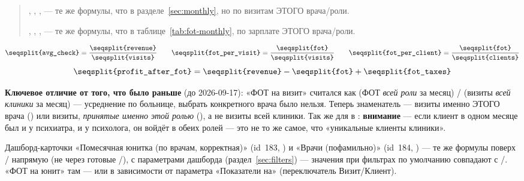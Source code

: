 \documentclass[11pt,a4paper]{article}
\begin{document}
\begin{quote}
\texttt{}, \texttt{}, \texttt{}, \texttt{}
--- те же формулы, что в разделе~\ref{sec:monthly}, но по визитам ЭТОГО врача/роли.

\texttt{}, \texttt{}, \texttt{}, \texttt{}
--- те же формулы, что в таблице~\ref{tab:fot-monthly}, по зарплате ЭТОГО врача/роли.
\end{quote}
\[
  \texttt{\seqsplit{avg\_check}} = \frac{\texttt{\seqsplit{revenue}}}{\texttt{\seqsplit{visits}}}
  \qquad
  \texttt{\seqsplit{fot\_per\_visit}} = \frac{\texttt{\seqsplit{fot}}}{\texttt{\seqsplit{visits}}}
  \qquad
  \texttt{\seqsplit{fot\_per\_client}} = \frac{\texttt{\seqsplit{fot}}}{\texttt{\seqsplit{clients}}}
\]
\[
  \texttt{\seqsplit{profit\_after\_fot}} = \texttt{\seqsplit{revenue}} - \texttt{\seqsplit{fot}} + \texttt{\seqsplit{fot\_taxes}}
\]

\textbf{Ключевое отличие от того, что было раньше} (до 2026-09-17):
«ФОТ на визит» считался как (ФОТ \emph{всей роли} за месяц) / (визиты
\emph{всей клиники} за месяц) --- усреднение по больнице, выбрать
конкретного врача было нельзя. Теперь знаменатель --- визиты именно
ЭТОГО врача (\texttt{}) или визиты, \emph{принятые
именно этой ролью} (\texttt{}), а не визиты всей клиники.
Так же для \texttt{} в \texttt{}:
\textbf{внимание} --- если клиент в одном месяце был и у психиатра, и у
психолога, он войдёт в \texttt{} обеих ролей --- это не то же
самое, что «уникальные клиенты клиники».

Дашборд-карточки «Помесячная юнитка (по врачам, корректная)» (id~183,
\texttt{}) и «Врачи (пофамильно)» (id~184,
\texttt{}) --- те же формулы поверх
\texttt{}/\allowbreak\texttt{}
напрямую (не через готовые \texttt{}/\allowbreak\texttt{}),
с параметрами дашборда (раздел~\ref{sec:filters}) --- значения при
фильтрах по умолчанию совпадают с \texttt{}/\allowbreak\texttt{}.
«ФОТ на юнит» там --- \texttt{} или \texttt{} в
зависимости от параметра «Показатели на» (переключатель Визит/Клиент).
\end{document}
